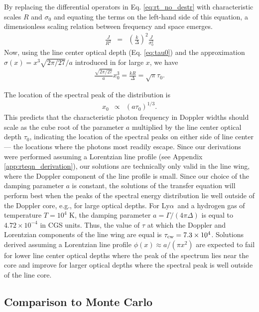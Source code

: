 \documentclass{aastex63}
\newcommand{\be}{\begin{eqnarray}}
\newcommand{\ee}{\end{eqnarray}}
\newcommand\lya{Ly$\alpha$\ }
\begin{document}
\ifx
By replacing the differential operators in Eq. \ref{eq:rt_no_destr} with characteristic scales $R$ and $\sigma_0$ and equating the terms on the left-hand side of this equation, a dimensionless scaling relation between frequency and space emerges.
\be
\frac{J}{R^2} &=& \left(\frac{k}{\Delta}\right)^2 \frac{J}{\sigma_0^2}
\ee
Now, using the line center optical depth (Eq. \ref{eq:tau0}) and the approximation $\sigma(x)=x^3\sqrt{2\pi/27}/a$ introduced in \cite{1973MNRAS.162...43H} for large $x$, we have
\be
\frac{\sqrt{2\pi/27}}{a}x_0^3 = \frac{kR}{\Delta} = \sqrt{\pi} \tau_0.
\ee
\fi

The location of the spectral peak of the distribution is
\be \label{eq:tau_peak_scaling}
x_0 &\propto& \left(a\tau_0\right)^{1/3}.
\ee
This predicts that the characteristic photon frequency in Doppler widths should scale as the cube root of the parameter $a$ multiplied by the line center optical depth $\tau_0$, indicating the location of the spectral peaks on either side of line center --- the locations where the photons most readily escape. Since our derivations were performed assuming a Lorentzian line profile (see Appendix \ref{app:rteqn_derivation}), our solutions are technically only valid in the line wing, where the Doppler component of the line profile is small. Since our choice of the damping parameter $a$ is constant, the solutions of the transfer equation will perform best when the peaks of the spectral energy distribution lie well outside of the Doppler core, e.g., for large optical depths. For \lya and a hydrogen gas of temperature $T=10^4$ K, the damping parameter $a = \Gamma / (4\pi\Delta)$ is equal to $4.72\times 10^{-4}$ in CGS units. Thus, the value of $\tau$ at which the Doppler and Lorentzian components of the line wing are equal is $\tau_{\rm cw}=7.3\times10^4$. Solutions derived assuming a Lorentzian line profile $\phi(x) \approx a/(\pi x^2)$ are expected to fail for lower line center optical depths where the peak of the spectrum lies near the core and improve for larger optical depths where the spectral peak is well outside of the line core.
\subsection{Comparison to Monte Carlo}

\end{document}
